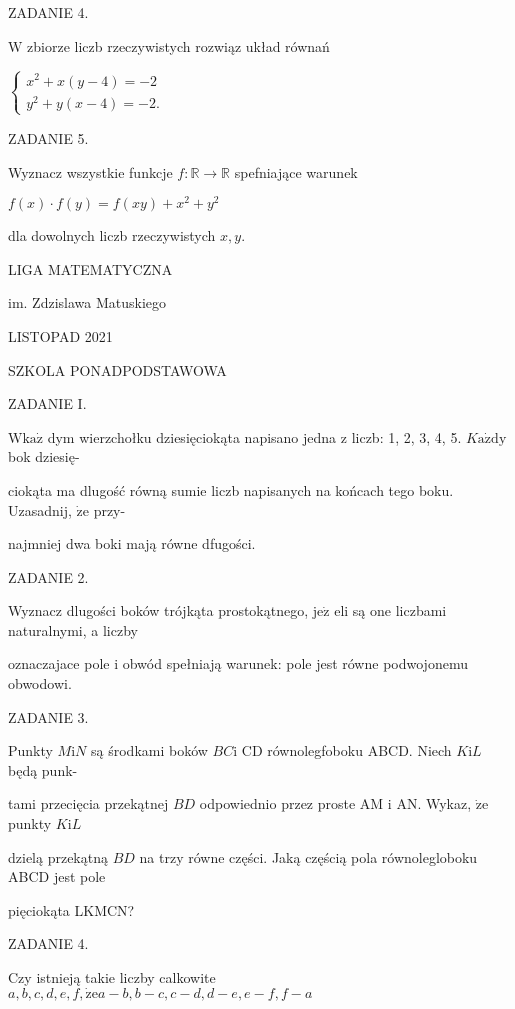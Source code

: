 \documentclass[a4paper,12pt]{article}
\begin{document}
ZADANIE 4.

$\mathrm{W}$ zbiorze liczb rzeczywistych rozwiąz układ równań

$\left\{\begin{array}{l}
x^{2}+x(y-4)=-2\\
y^{2}+y(x-4)=-2.
\end{array}\right.$

ZADANIE 5.

Wyznacz wszystkie funkcje $f:\mathbb{R}\rightarrow \mathbb{R}$ spefniające warunek

$f(x)\cdot f(y)=f(xy)+x^{2}+y^{2}$

dla dowolnych liczb rzeczywistych $x, y.$






LIGA MATEMATYCZNA

im. Zdzislawa Matuskiego

LISTOPAD 2021

SZKOLA PONADPODSTAWOWA

ZADANIE I.

$\mathrm{W}\mathrm{k}\mathrm{a}\dot{\mathrm{z}}$ dym wierzchołku dziesięciokąta napisano jedna z liczb: 1, 2, 3, 4, 5. $K\mathrm{a}\dot{\mathrm{z}}\mathrm{d}\mathrm{y}$ bok dziesię-

ciokąta ma dlugość równą sumie liczb napisanych na końcach tego boku. Uzasadnij, $\dot{\mathrm{z}}\mathrm{e}$ przy-

najmniej dwa boki mają równe dfugości.

ZADANIE 2.

Wyznacz dlugości boków trójkąta prostokątnego, $\mathrm{j}\mathrm{e}\dot{\mathrm{z}}$ eli są one liczbami naturalnymi, a liczby

oznaczajace pole i obwód spełniają warunek: pole jest równe podwojonemu obwodowi.

ZADANIE 3.

Punkty $M\mathrm{i}N$ są środkami boków $BC\mathrm{i}$ CD równolegfoboku ABCD. Niech $K\mathrm{i}L$ będą punk-

tami przecięcia przekątnej $BD$ odpowiednio przez proste AM $\mathrm{i}$ AN. Wykaz, $\dot{\mathrm{z}}\mathrm{e}$ punkty $K\mathrm{i}L$

dzielą przekątną $BD$ na trzy równe części. Jaką częścią pola równolegloboku ABCD jest pole

pięciokąta LKMCN?

ZADANIE 4.

Czy istnieją takie liczby calkowite $a, b, c, d, e, f, \dot{\mathrm{z}}\mathrm{e}a-b, b-c, c-d, d-e, e-f, f-a$
\end{document}
